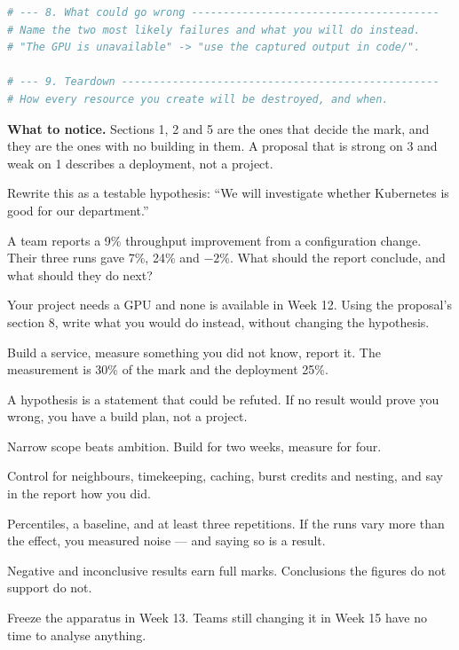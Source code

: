 \begin{lab}
\begin{lstlisting}[language=bash]
# --- 8. What could go wrong ---------------------------------------
# Name the two most likely failures and what you will do instead.
# "The GPU is unavailable" -> "use the captured output in code/".

# --- 9. Teardown --------------------------------------------------
# How every resource you create will be destroyed, and when.
\end{lstlisting}

\textbf{What to notice.} Sections 1, 2 and 5 are the ones that decide the
mark, and they are the ones with no building in them. A proposal that is strong
on 3 and weak on 1 describes a deployment, not a project.
\end{lab}

\begin{checkpoint}
\begin{tightnum}
  \item Rewrite this as a testable hypothesis: ``We will investigate whether
        Kubernetes is good for our department.''
  \item A team reports a 9\% throughput improvement from a configuration
        change. Their three runs gave 7\%, 24\% and $-2$\%. What should the
        report conclude, and what should they do next?
  \item Your project needs a GPU and none is available in Week 12. Using the
        proposal's section 8, write what you would do instead, without changing
        the hypothesis.
\end{tightnum}
\end{checkpoint}

\begin{chaptersummary}
\begin{tight}
  \item Build a service, measure something you did not know, report it. The
        measurement is 30\% of the mark and the deployment 25\%.
  \item A hypothesis is a statement that could be refuted. If no result would
        prove you wrong, you have a build plan, not a project.
  \item Narrow scope beats ambition. Build for two weeks, measure for four.
  \item Control for neighbours, timekeeping, caching, burst credits and
        nesting, and say in the report how you did.
  \item Percentiles, a baseline, and at least three repetitions. If the runs
        vary more than the effect, you measured noise --- and saying so is a
        result.
  \item Negative and inconclusive results earn full marks. Conclusions the
        figures do not support do not.
  \item Freeze the apparatus in Week 13. Teams still changing it in Week 15
        have no time to analyse anything.
\end{tight}
\end{chaptersummary}

